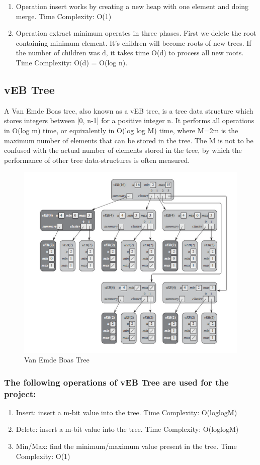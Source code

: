 \documentclass{article}
\begin{document}
\begin{enumerate}
\item Operation insert works by creating a new heap with one element and doing merge. Time Complexity: O(1)
\item Operation extract minimum operates in three phases. First we delete the root containing minimum element. It's children will become roots of new trees. If the number of children was d, it takes time O(d) to process all new roots. Time Complexity: O(d) = O(log n). 
\end{enumerate}

\subsection{vEB Tree}
A Van Emde Boas tree, also known as a vEB tree, is a tree data structure which stores integers between [0, n-1] for a positive integer n.  It performs all operations in O(log m) time, or equivalently in O(log log M) time, where M=2m is the maximum number of elements that can be stored in the tree. The M is not to be confused with the actual number of elements stored in the tree, by which the performance of other tree data-structures is often measured.

\begin{figure}[h!]
\centering
\includegraphics[width=0.72\columnwidth]{vEB.png}
\caption{Van Emde Boas Tree}
\label{fig:vb}
\end{figure}


\subsubsection{The following operations of vEB Tree are used for the project:}
\begin{enumerate}
\item Insert: insert a m-bit value into the tree. Time Complexity: O(loglogM)
\item Delete: insert a m-bit value into the tree. Time Complexity: O(loglogM)
\item Min/Max: find the minimum/maximum value present in the tree. Time Complexity: O(1)
\end{enumerate}
\end{document}

